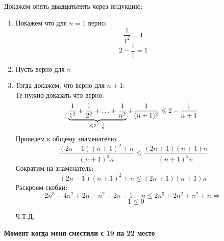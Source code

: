 \documentclass{report}
\begin{document}
\sol
Докажем опять \sout{двадцатьпять} через индукцию:\\
\begin{enumerate}
	\item Покажем что для $n=1$ верно: \\ 
		\begin{equation*}
			\dfrac{1}{1^2}=1
		\end{equation*}
		\begin{equation*}
			2-\dfrac{1}{1}=1
		\end{equation*}
	\item Пусть верно для $n$ \\
	\item Тогда докажем, что верно для $n+1$:\\
		Те нужно доказать что верно:
		\begin{equation*}
			\underbrace{\dfrac{1}{1^2}+\dfrac{1}{2^2}+\mathellipsis+\dfrac{1}{n^2}}_{\leqslant 2-\frac{1}{n}}+\dfrac{1}{(n+1)^2} \leqslant 2-\dfrac{1}{n+1}
		\end{equation*}
		Приведем к общему знаменателю:
		\begin{equation*}
			\dfrac{(2n-1)(n+1)^2+n}{(n+1)^2n} \leqslant \dfrac{(2n+1)(n+1)n}{(n+1)^2n}
		\end{equation*}
		Сократим на знаменатель:
		\begin{equation*}
			(2n-1)(n+1)^2+n\leqslant (2n+1)(n+1)n
		\end{equation*}
		Раскроем скобки:
		\begin{equation*}
			2n^3+4n^2+2n-n^2-2n-1+n\leqslant 2n^3+2n^2+n^2+n \Rightarrow
		\end{equation*}
		\begin{equation*}
			-1\leqslant 0
		\end{equation*}
		\begin{center}
			Ч.Т.Д.
		\end{center}

\end{enumerate}


\begin{center}
	\textbf{\Large{Момент когда меня сместили с 19 на 22 место}}
\end{center}
\hrulefill
\end{document}
